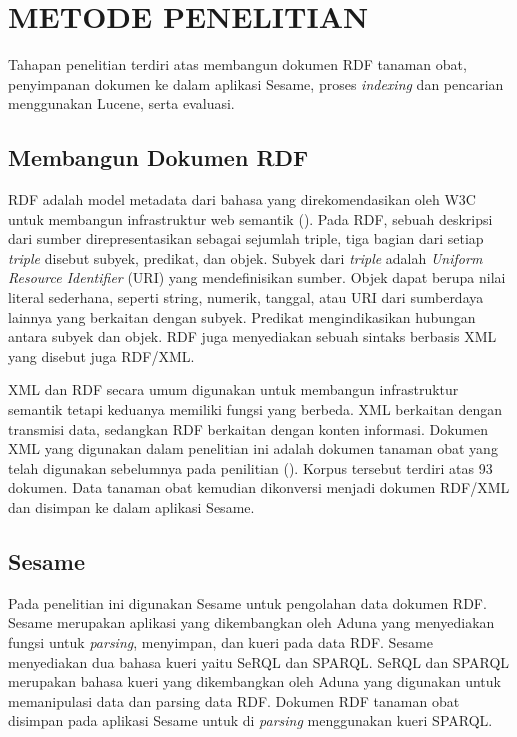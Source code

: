 \section*{METODE PENELITIAN}
Tahapan penelitian terdiri atas membangun dokumen RDF tanaman obat, penyimpanan dokumen ke dalam aplikasi Sesame, proses \textit{indexing} dan pencarian menggunakan Lucene, serta evaluasi.

\subsection*{Membangun Dokumen RDF}
RDF adalah model metadata dari bahasa yang direkomendasikan oleh W3C untuk membangun infrastruktur web semantik (\cite{GUTIERREZ}). Pada RDF, sebuah deskripsi dari sumber direpresentasikan sebagai sejumlah triple, tiga bagian dari setiap \textit{triple} disebut subyek, predikat, dan objek. Subyek dari \textit{triple} adalah \textit{Uniform Resource Identifier} (URI) yang mendefinisikan sumber. Objek dapat berupa nilai literal sederhana, seperti string, numerik, tanggal, atau URI dari sumberdaya lainnya yang berkaitan dengan subyek. Predikat mengindikasikan hubungan antara subyek dan objek. RDF juga menyediakan sebuah sintaks berbasis XML yang disebut juga RDF/XML.

XML dan RDF secara umum digunakan untuk membangun infrastruktur semantik tetapi keduanya memiliki fungsi yang berbeda. XML berkaitan dengan transmisi data, sedangkan RDF berkaitan dengan konten informasi. Dokumen XML yang digunakan dalam penelitian ini adalah dokumen tanaman obat yang telah digunakan sebelumnya pada penilitian \citeauthor{HERAWAN} (\cite*{HERAWAN}). Korpus tersebut terdiri atas 93 dokumen. Data tanaman obat kemudian dikonversi menjadi dokumen RDF/XML dan disimpan ke dalam aplikasi Sesame.

\subsection*{Sesame}
Pada penelitian ini digunakan Sesame untuk pengolahan data dokumen RDF. Sesame merupakan aplikasi yang dikembangkan oleh Aduna yang menyediakan fungsi untuk \textit{parsing}, menyimpan, dan kueri pada data RDF. Sesame menyediakan dua bahasa kueri yaitu SeRQL dan SPARQL. SeRQL dan SPARQL merupakan bahasa kueri yang dikembangkan oleh Aduna yang digunakan untuk memanipulasi data dan parsing data RDF. Dokumen RDF tanaman obat disimpan pada aplikasi Sesame untuk di \textit{parsing} menggunakan kueri SPARQL.

